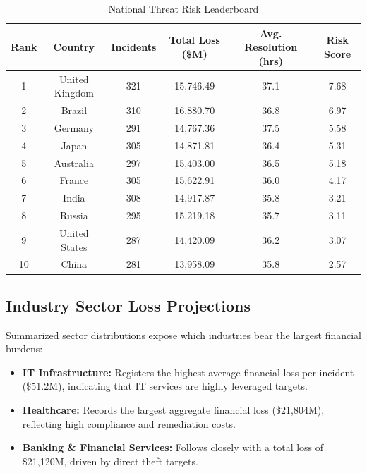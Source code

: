 \documentclass[a4paper, 12pt]{report}
\begin{document}
\begin{table}[h!]
\centering
\small
\caption{National Threat Risk Leaderboard}
\begin{tabular}{cccccc}
\toprule
\textbf{Rank} & \textbf{Country} & \textbf{Incidents} & \textbf{Total Loss (\$M)} & \textbf{Avg. Resolution (hrs)} & \textbf{Risk Score} \\
\midrule
1 & United Kingdom & 321 & 15,746.49 & 37.1 & 7.68 \\
2 & Brazil & 310 & 16,880.70 & 36.8 & 6.97 \\
3 & Germany & 291 & 14,767.36 & 37.5 & 5.58 \\
4 & Japan & 305 & 14,871.81 & 36.4 & 5.31 \\
5 & Australia & 297 & 15,403.00 & 36.5 & 5.18 \\
6 & France & 305 & 15,622.91 & 36.0 & 4.17 \\
7 & India & 308 & 14,917.87 & 35.8 & 3.21 \\
8 & Russia & 295 & 15,219.18 & 35.7 & 3.11 \\
9 & United States & 287 & 14,420.09 & 36.2 & 3.07 \\
10 & China & 281 & 13,958.09 & 35.8 & 2.57 \\
\bottomrule
\end{tabular}
\end{table}

\subsection{Industry Sector Loss Projections}
Summarized sector distributions expose which industries bear the largest financial burdens:
\begin{itemize}
    \item \textbf{IT Infrastructure:} Registers the highest average financial loss per incident (\$51.2M), indicating that IT services are highly leveraged targets.
    \item \textbf{Healthcare:} Records the largest aggregate financial loss (\$21,804M), reflecting high compliance and remediation costs.
    \item \textbf{Banking \& Financial Services:} Follows closely with a total loss of \$21,120M, driven by direct theft targets.
\end{itemize}
\end{document}
